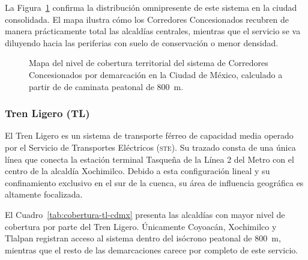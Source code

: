 La Figura~\ref{fig:mapa-cobertura-cc} confirma la distribución omnipresente de
este sistema en la ciudad consolidada. El mapa ilustra cómo los Corredores
Concesionados recubren de manera prácticamente total las alcaldías centrales,
mientras que el servicio se va diluyendo hacia las periferias con suelo de
conservación o menor densidad.

\begin{figure}[H]
    \centering
    \caption[Mapa de cobertura territorial de Corredores Concesionados en la CDMX]{
    Mapa del nivel de cobertura territorial del sistema de Corredores
    Concesionados por demarcación en la Ciudad de México, calculado a partir de
     de caminata peatonal de 800~m.}
    \label{fig:mapa-cobertura-cc}
\end{figure}

\subsubsection{Tren Ligero (TL)}
\label{subsubsec:cobertura-tl}

El Tren Ligero es un sistema de transporte férreo de capacidad media operado por
el Servicio de Transportes Eléctricos (\textsc{ste}). Su trazado consta de una
única línea que conecta la estación terminal Tasqueña de la Línea 2 del Metro con
el centro de la alcaldía Xochimilco. Debido a esta configuración lineal y su
confinamiento exclusivo en el sur de la cuenca, su área de influencia geográfica
es altamente focalizada.

El Cuadro~\ref{tab:cobertura-tl-cdmx} presenta las alcaldías con mayor nivel de
cobertura por parte del Tren Ligero. Únicamente Coyoacán, Xochimilco y Tlalpan
registran acceso al sistema dentro del isócrono peatonal de 800~m, mientras que
el resto de las demarcaciones carece por completo de este servicio.

